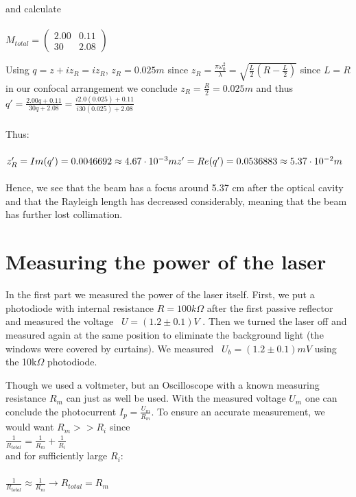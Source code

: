 \documentclass{article}
\begin{document}
and calculate
\\\\
$M_{total}= \begin{pmatrix}
2.00 & 0.11\\
30 & 2.08
\end{pmatrix}
$

Using $q = z+iz_R = iz_R$, $z_R = 0.025m$ since $z_R = \frac{\pi \omega^2_0}{\lambda} = \sqrt{\frac{L}{2}(R-\frac{L}{2})}$ since $L=R$ in our confocal arrangement we conclude $z_R=\frac{R}{2}=0.025m$ and thus $q' = \frac{2.00q+0.11}{30q+2.08} = \frac{i2.0(0.025)+0.11}{i30(0.025)+2.08}$
\\\\
Thus:
\\\\
$z'_R = Im(q') = 0.0046692 \approx 4.67\cdot10^{-3}m
\\\\
z' = Re(q') =  0.0536883 \approx 5.37\cdot10^{-2}m
$
\\\\
Hence, we see that the beam has a focus around 5.37 cm after the optical cavity and that the Rayleigh length has decreased considerably, meaning that the beam has further lost collimation.


\section{Measuring the power of the laser}

In the first part we measured the power of the laser itself. First, we put a photodiode with internal resistance $R= 100k\Omega$
after the first passive reflector and measured the voltage
\ $U=(1.2 \pm 0.1) V$ %
. Then we turned the laser off and measured again at the same position to eliminate the background light (the windows were covered by curtains). We measured 
\ $U_b = (1.2 \pm 0.1)mV$ 
using the 
10k$\Omega$
photodiode. 


Though we used a voltmeter, but an Oscilloscope with a known measuring resistance $R_m$ can just as well be used. With the measured voltage $U_m$ one can conclude the photocurrent $I_p = \frac{U_m}{R_m}$. To ensure an accurate measurement, we would want $R_m >>R_i$ since\\

$\frac{1}{R_{total}}= \frac{1}{R_m}+\frac{1}{R_i}$\\

and for sufficiently large $R_i$:\\
$\hspace{3cm}$\\
$\frac{1}{R_{total}} \approx \frac{1}{R_m} \rightarrow R_{total} = R_m$
\end{document}
